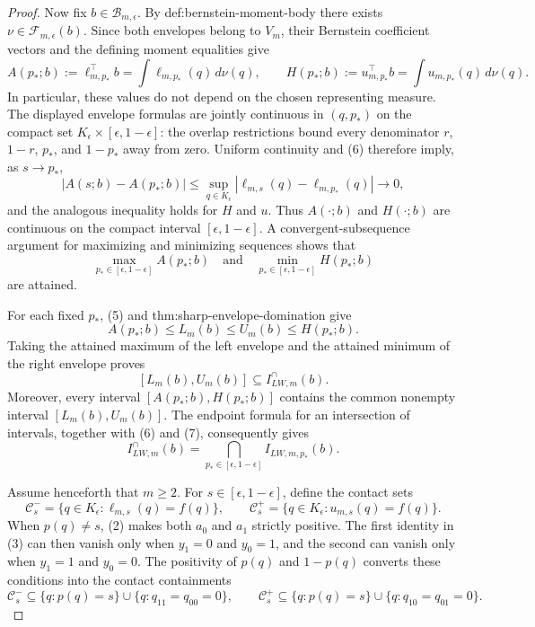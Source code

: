 \documentclass{article}
\begin{document}
\begin{proof}
Now fix \(b\in\mathcal B_{m,\epsilon}\). By
def:bernstein-moment-body there exists
\(\nu\in\mathcal F_{m,\epsilon}(b)\). Since both envelopes belong to
\(V_m\), their Bernstein coefficient vectors and the defining moment equalities
give
\[
A(p_*;b):=\ell_{m,p_*}^{\top}b
=\int\ell_{m,p_*}(q)\,d\nu(q),
\qquad
H(p_*;b):=u_{m,p_*}^{\top}b
=\int u_{m,p_*}(q)\,d\nu(q).                                    \tag{6}
\]
In particular, these values do not depend on the chosen representing measure.
The displayed envelope formulas are jointly continuous in \((q,p_*)\) on the
compact set \(K_{\epsilon}\times[\epsilon,1-\epsilon]\): the overlap
restrictions bound every denominator \(r\), \(1-r\), \(p_*\), and
\(1-p_*\) away from zero. Uniform continuity and (6) therefore imply, as
\(s\to p_*\),
\[
|A(s;b)-A(p_*;b)|
\leq\sup_{q\in K_{\epsilon}}
|\ell_{m,s}(q)-\ell_{m,p_*}(q)|\longrightarrow0,
\]
and the analogous inequality holds for \(H\) and \(u\). Thus \(A(\cdot;b)\)
and \(H(\cdot;b)\) are continuous on the compact interval
\([\epsilon,1-\epsilon]\). A convergent-subsequence argument for maximizing
and minimizing sequences shows that
\[
\max_{p_*\in[\epsilon,1-\epsilon]}A(p_*;b)
\quad\text{and}\quad
\min_{p_*\in[\epsilon,1-\epsilon]}H(p_*;b)                       \tag{7}
\]
are attained.

For each fixed \(p_*\), (5) and thm:sharp-envelope-domination give
\[
A(p_*;b)\leq L_m(b)\leq U_m(b)\leq H(p_*;b).                     \tag{8}
\]
Taking the attained maximum of the left envelope and the attained minimum of
the right envelope proves
\[
[L_m(b),U_m(b)]\subseteq I_{LW,m}^{\cap}(b).                      \tag{9}
\]
Moreover, every interval \([A(p_*;b),H(p_*;b)]\) contains the common nonempty
interval \([L_m(b),U_m(b)]\). The endpoint formula for an intersection of
intervals, together with (6) and (7), consequently gives
\[
I_{LW,m}^{\cap}(b)
=\bigcap_{p_*\in[\epsilon,1-\epsilon]}I_{LW,m,p_*}(b).            \tag{10}
\]

Assume henceforth that \(m\geq2\). For
\(s\in[\epsilon,1-\epsilon]\), define the contact sets
\[
\mathcal C_s^-=
\{q\in K_{\epsilon}:\ell_{m,s}(q)=f(q)\},
\qquad
\mathcal C_s^+=
\{q\in K_{\epsilon}:u_{m,s}(q)=f(q)\}.
\]
When \(p(q)\neq s\), (2) makes both \(a_0\) and \(a_1\) strictly positive.
The first identity in (3) can then vanish only when \(y_1=0\) and \(y_0=1\),
and the second can vanish only when \(y_1=1\) and \(y_0=0\). The positivity
of \(p(q)\) and \(1-p(q)\) converts these conditions into the contact
containments
\[
\mathcal C_s^-
\subseteq\{q:p(q)=s\}\cup\{q:q_{11}=q_{00}=0\},
\qquad
\mathcal C_s^+
\subseteq\{q:p(q)=s\}\cup\{q:q_{10}=q_{01}=0\}.                  \tag{11}
\]


\end{proof}
\end{document}
